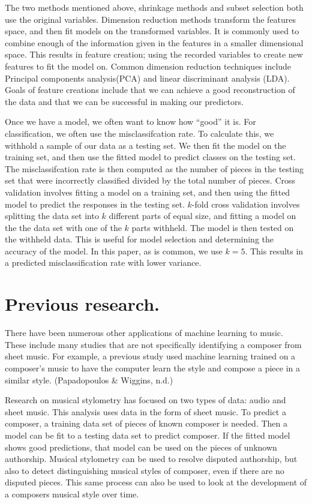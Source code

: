 \documentclass[12pt,twoside]{reedthesis}
\theoremstyle{definition}
\theoremstyle{definition}
\theoremstyle{definition}
\theoremstyle{remark}
\begin{document}
The two methods mentioned above, shrinkage methods and subset selection
both use the original variables. Dimension reduction methods transform
the features space, and then fit models on the transformed variables. It
is commonly used to combine enough of the information given in the
features in a smaller dimensional space. This results in feature
creation; using the recorded variables to create new features to fit the
model on. Common dimension reduction techniques include Principal
components analysis(PCA) and linear discriminant analysis (LDA). Goals
of feature creations include that we can achieve a good reconstruction
of the data and that we can be successful in making our predictors.

Once we have a model, we often want to know how ``good'' it is. For
classification, we often use the misclassifcation rate. To calculate
this, we withhold a sample of our data as a testing set. We then fit the
model on the training set, and then use the fitted model to predict
classes on the testing set. The misclassifcation rate is then computed
as the number of pieces in the testing set that were incorrectly
classified divided by the total number of pieces. Cross validation
involves fitting a model on a training set, and then using the fitted
model to predict the responses in the testing set. \(k\)-fold cross
validation involves splitting the data set into \(k\) different parts of
equal size, and fitting a model on the the data set with one of the
\(k\) parts withheld. The model is then tested on the withheld data.
This is useful for model selection and determining the accuracy of the
model. In this paper, as is common, we use \(k = 5\). This results in a
predicted misclassification rate with lower variance.

\section{Previous research.}\label{previous-research.}

There have been numerous other applications of machine learning to
music. These include many studies that are not specifically identifying
a composer from sheet music. For example, a previous study used machine
learning trained on a composer's music to have the computer learn the
style and compose a piece in a similar style. (Papadopoulos \& Wiggins,
n.d.)

Research on musical stylometry has focused on two types of data: audio
and sheet music. This analysis uses data in the form of sheet music. To
predict a composer, a training data set of pieces of known composer is
needed. Then a model can be fit to a testing data set to predict
composer. If the fitted model shows good predictions, that model can be
used on the pieces of unknown authorship. Musical stylometry can be used
to resolve disputed authorship, but also to detect distinguishing
musical styles of composer, even if there are no disputed pieces. This
same process can also be used to look at the development of a composers
musical style over time.
\end{document}

